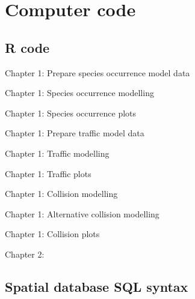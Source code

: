 \chapter{Computer code}\label{apx:A}
\newpage

\section{R code}

\noindent Chapter 1: Prepare species occurrence model data


\noindent Chapter 1: Species occurrence modelling


\noindent Chapter 1: Species occurrence plots


\noindent Chapter 1: Prepare traffic model data


\noindent Chapter 1: Traffic modelling


\noindent Chapter 1: Traffic plots


\noindent Chapter 1: Collision modelling


\noindent Chapter 1: Alternative collision modelling


\noindent Chapter 1: Collision plots


\noindent Chapter 2:

\section{Spatial database SQL syntax}